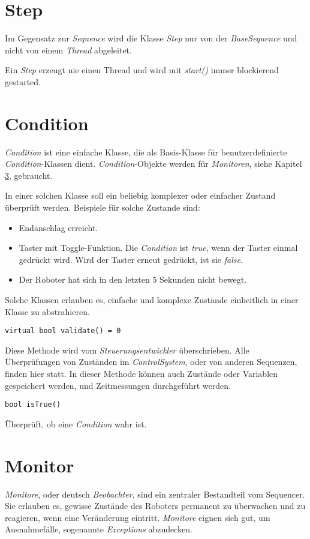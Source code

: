 \section{Step}
Im Gegensatz zur \textit{Sequence} wird die Klasse \textit{Step} nur von der \textit{BaseSequence} und nicht von einem \textit{Thread} abgeleitet.

Ein \textit{Step} erzeugt nie einen Thread und wird mit \textit{start()} immer blockierend gestarted.



\section{Condition}
\label{Condition}
\textit{Condition} ist eine einfache Klasse, die als Basis-Klasse für benutzerdefinierte \textit{Condition}-Klassen dient.
\textit{Condition}-Objekte werden für \textit{Monitoren}, siehe Kapitel \ref{Monitor}, gebraucht.

In einer solchen Klasse soll ein beliebig komplexer oder einfacher Zustand überprüft werden.
Beispiele für solche Zustande sind:
\begin{itemize}
\item Endanschlag erreicht.
\item Taster mit Toggle-Funktion. Die \textit{Condition} ist \textit{true}, wenn der Taster einmal gedrückt wird. Wird der Taster erneut gedrückt, ist sie \textit{false}.
\item Der Roboter hat sich in den letzten 5 Sekunden nicht bewegt.
\end{itemize}

Solche Klassen erlauben es, einfache und komplexe Zustände einheitlich in einer Klasse zu abstrahieren.

\begin{lstlisting}
virtual bool validate() = 0
\end{lstlisting}
Diese Methode wird vom \textit{Steuerungsentwickler} überschrieben.
Alle Überprüfungen von Zuständen im \textit{ControlSystem}, oder von anderen Sequenzen, finden hier statt.
In dieser Methode können auch Zustände oder Variablen gespeichert werden, und Zeitmessungen durchgeführt werden.


\begin{lstlisting}
bool isTrue()
\end{lstlisting}
Überprüft, ob eine \textit{Condition} wahr ist.



\section{Monitor}
\label{Monitor}
\textit{Monitore}, oder deutsch \textit{Beobachter}, sind ein zentraler Bestandteil vom Sequencer.
Sie erlauben es, gewisse Zustände des Roboters permanent zu überwachen und zu reagieren, wenn eine Veränderung eintritt.
\textit{Monitore} eignen sich gut, um Ausnahmefälle, sogenannte \textit{Exceptions} abzudecken.

